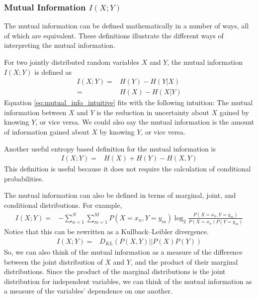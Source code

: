         \subsubsection{Mutual Information $I(X;Y)$}
        The mutual information can be defined mathematically in a number of ways, all of which are equivalent. These definitions illustrate the different ways of interpreting the mutual information.

        For two jointly distributed random variables $X$ and $Y$, the mutual information $I(X;Y)$ is defined as
        \begin{align}\label{eq:mutual_info_intuitive}
            I(X;Y)  =& H(Y) - H(Y|X) \\
                    =& H(X) - H(X|Y)
        \end{align}
        Equation \ref{eq:mutual_info_intuitive} fits with the following intuition: The mutual information between $X$ and $Y$ is the reduction in uncertainty about $X$ gained by knowing $Y$, or vice versa. We could also say the mutual information is the amount of information gained about $X$ by knowing $Y$, or vice versa.

        Another useful entropy based definition for the mutual information is
        \begin{align}\label{eq:mutual_info_useful}
            I(X;Y)  =& H(X) + H(Y) - H(X,Y)
        \end{align}
        This definition is useful because it does not require the calculation of conditional probabilities.

        The mutual information can also be defined in terms of marginal, joint, and conditional distributions. For example,
        \begin{align}\label{eq:mutual_info_log}
            I(X;Y)  =& -\sum_{n=1}^N \sum_{m=1}^M P(X=x_n, Y=y_m) \log _2 \frac{P(X=x_n, Y=y_m)}{P(X=x_n) P(Y=y_m)}
        \end{align}
        Notice that this can be rewritten as a Kullback–Leibler divergence.
        \begin{align}
            I(X;Y)  =& D_{KL}(P(X,Y)|| P(X)P(Y))
        \end{align}
        So, we can also think of the mutual information as a measure of the difference between the joint distribution of $X$ and $Y$, and the product of their marginal distributions. Since the product of the marginal distributions is the joint distribution for independent variables, we can think of the mutual information as a measure of the variables' dependence on one another.

